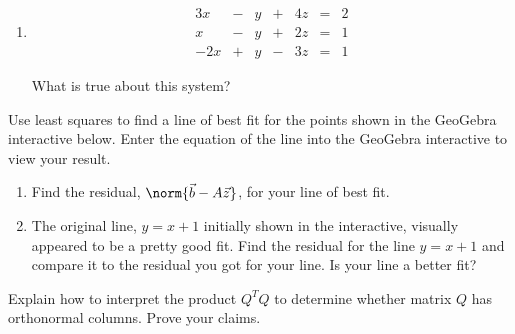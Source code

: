 \documentclass{ximera}
\begin{document}
\begin{problem}
\begin{enumerate}
    \item
    \begin{equation}
\begin{array}{ccccccccc}
      3x &- &y&+&4z&= &2 \\
     x&-&y&+&2z&=&1\\
     -2x&+&y&-&3z&=&1
    \end{array}
    \end{equation}
 
    What is true about this system?
    \begin{multipleChoice}
    \end{multipleChoice}
 
         \end{enumerate}
\end{problem}
 
\begin{problem}\label{prob_oct_lineFit}
  Use least squares to find a line of best fit for the points shown in the GeoGebra interactive below.
  Enter the equation of the line into the GeoGebra interactive to view your result.
 
  \begin{center}
  \end{center}
   
  \begin{enumerate}
    \item Find the residual, $\norm{\vec{b}-A\vec{z}}$, for your line of best fit. 
    \item The original line, $y=x+1$ initially shown in the interactive, visually appeared to be a pretty good fit.  Find the residual for the line $y=x+1$ and compare it to the residual you got for your line.  Is your line a better fit?
  \end{enumerate}
\end{problem}
 
\begin{problem}\label{prob_oct_orth}
  Explain how to interpret the product $Q^TQ$ to determine whether matrix $Q$ has orthonormal columns.  Prove your claims.
\end{problem}
 
\end{document}
